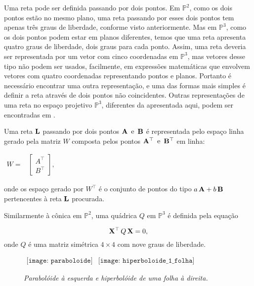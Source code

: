 Uma reta pode ser definida passando por dois pontos. Em $\mathbb{P}^2$, como os dois pontos estão no mesmo plano, uma reta passando por esses dois pontos tem apenas três graus de liberdade, conforme visto anteriormente. Mas em $\mathbb{P}^3$, como os dois pontos podem estar em planos diferentes, temos que uma reta apresenta quatro graus de liberdade, dois graus para cada ponto. Assim, uma reta deveria ser representada por um vetor com cinco coordenadas em $\mathbb{P}^3$, mas vetores desse tipo não podem ser usados, facilmente, em expressões matemáticas que envolvem vetores com quatro coordenadas representando pontos e planos. Portanto é necessário encontrar uma outra representação, e uma das formas mais simples é definir a reta através de dois pontos não coincidentes. Outras representações de uma reta no espaço projetivo $\mathbb{P}^3$, diferentes da apresentada aqui, podem ser encontradas em \cite{Hartley2004}.


Uma reta ${\bf L}$ passando por dois pontos ${\bf A} \,\,\, \text{e} \,\,\, {\bf B}$ é representada pelo espaço linha gerado pela matriz $W$ composta pelos pontos ${\bf A}^\top \,\,\,\text{e} \,\,\, {\bf B}^\top$ em linha:

\begin{center}
$
\begin{array}{cc}
W = 
& \begin{bmatrix}
  A^\top\\
  B^\top
  \end{bmatrix},
\end{array}
$
\end{center}
onde os espaço gerado por $W^\top$ é o conjunto de pontos do tipo $a\,{\bf A} + b\,{\bf B}$ pertencentes à reta ${\bf L}$ procurada. \\




Similarmente à cônica em $\mathbb{P}^2$, uma quádrica $Q$ em $\mathbb{P}^3$ é definida pela equação

\begin{equation*}
\mathbf{X}^\top\,Q\,\mathbf{X} = 0,
\end{equation*}
onde $Q$ é uma matriz simétrica $4\times4$ com nove graus de liberdade.




\begin{figure}[!htb]
$
\begin{array}{cc}
\texttt{[image: paraboloide]}
&
\texttt{[image: hiperboloide\_1\_folha]}
\end{array}
$
\caption{\textit{Parabolóide à esquerda e hiperbolóide de uma folha à direita.}}
\label{quadricas}
\end{figure}


